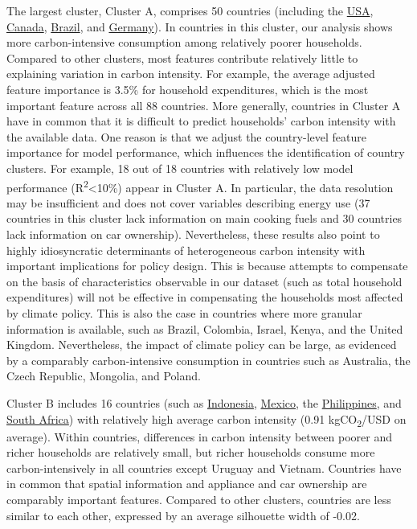 \documentclass[12pt, a4paper]{article}
\begin{document}
The largest cluster, Cluster A, comprises 50 countries (including the \hyperref[fig:5b_USA]{USA}, \hyperref[fig:5b_CAN]{Canada}, \hyperref[fig:5b_BRA]{Brazil}, and \hyperref[fig:5b_DEU]{Germany}). In countries in this cluster, our analysis shows more carbon-intensive consumption among relatively poorer households. Compared to other clusters, most features contribute relatively little to explaining variation in carbon intensity. For example, the average adjusted feature importance is 3.5\% for household expenditures, which is the most important feature across all 88 countries. More generally, countries in Cluster A have in common that it is difficult to predict households' carbon intensity with the available data. One reason is that we adjust the country-level feature importance for model performance, which influences the identification of country clusters. For example, 18 out of 18 countries with relatively low model performance (R\textsuperscript{2}\textless 10\%) appear in Cluster A. In particular, the data resolution may be insufficient and does not cover variables describing energy use (37 countries in this cluster lack information on main cooking fuels and 30 countries lack information on car ownership). Nevertheless, these results also point to highly idiosyncratic determinants of heterogeneous carbon intensity with important implications for policy design. This is because attempts to compensate on the basis of characteristics observable in our dataset (such as total household expenditures) will not be effective in compensating the households most affected by climate policy. This is also the case in countries where more granular information is available, such as Brazil, Colombia, Israel, Kenya, and the United Kingdom. Nevertheless, the impact of climate policy can be large, as evidenced by a comparably carbon-intensive consumption in countries such as Australia, the Czech Republic, Mongolia, and Poland. 

Cluster B includes 16 countries (such as \hyperref[fig:5b_IDN]{Indonesia}, \hyperref[fig:5b_MEX]{Mexico}, the \hyperref[fig:5b_PHL]{Philippines}, and \hyperref[fig:5b_ZAF]{South Africa}) with relatively high average carbon intensity (0.91 kgCO\textsubscript{2}/USD on average). Within countries, differences in carbon intensity between poorer and richer households are relatively small, but richer households consume more carbon-intensively in all countries except Uruguay and Vietnam. Countries have in common that spatial information and appliance and car ownership are comparably important features. Compared to other clusters, countries are less similar to each other, expressed by an average silhouette width of -0.02. 
\end{document}
